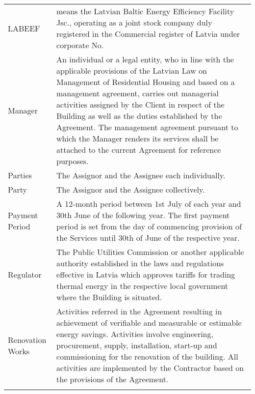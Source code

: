 \documentclass[a4paper]{article}
\begin{document}
\begin{longtabu}{|X|X[2]|}
   \hline

   LABEEF & means the Latvian Baltic Energy Efficiency Facility Jsc.,
   operating as a joint stock company duly registered in the Commercial
   register of Latvia under corporate No.\\\tabucline{}

   \hline

   Manager & An individual or a legal entity, who in line with the
   applicable provisions of the Latvian Law on Management of
   Residential Housing and based on a management agreement, carries out
   managerial activities assigned by the Client in respect of the
   Building as well as the duties established by the Agreement. The
   management agreement pursuant to which the Manager renders its
   services shall be attached to the current Agreement for reference
   purposes.\\\tabucline{}

   \hline

   Parties & The Assignor and the Assignee each individually.\\\tabucline{}

   \hline

   Party & The Assignor and the Assignee collectively.\\\tabucline{}

   \hline

   Payment Period & A 12{-}month period between 1st July of each year
   and 30th June of the following year. The first payment period is set
   from the day of commencing provision of the Services until 30th of
   June of the respective year. \\\tabucline{}

   \hline

   Regulator & The Public Utilities Commission or another applicable
   authority established in the laws and regulations effective in
   Latvia which approves tariffs for trading thermal energy in the
   respective local government where the Building is situated.\\\tabucline{}

   \hline

   Renovation Works & Activities referred in the Agreement resulting in
   achievement of verifiable and measurable or estimable energy
   savings. Activities involve engineering, procurement, supply,
   installation, start{-}up and commissioning for the renovation of the
   building. All activities are implemented by the Contractor based on
   the provisions of the Agreement.\\\tabucline{}


\end{longtabu}
\end{document}
